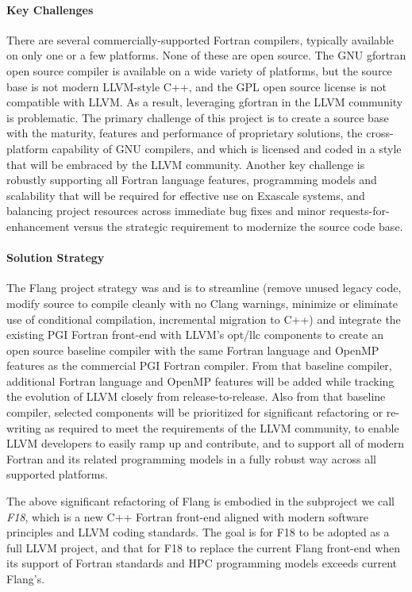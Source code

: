 \paragraph{Key Challenges}
There are several commercially-supported Fortran compilers, typically available on
only one or a few platforms.  None of these are open source.  The GNU gfortran
open source compiler is available on a wide variety of platforms, but the source
base is not modern LLVM-style C++, and the GPL open source license is not compatible
with LLVM. As a result, leveraging gfortran in the LLVM community is problematic.
The primary challenge of this project is to create a source base with the maturity,
features and performance of proprietary solutions, the cross-platform capability
of GNU compilers, and which is licensed and coded in a style that will be embraced
by the LLVM community.  Another key challenge is robustly supporting all Fortran
language features, programming models and scalability that will be required for
effective use on Exascale systems, and balancing project resources across immediate
bug fixes and minor requests-for-enhancement versus the strategic requirement to
modernize the source code base.

\paragraph{Solution Strategy}
The Flang project strategy was and is to streamline (remove unused legacy code,
modify source to compile cleanly with no Clang warnings, minimize or eliminate use
of conditional compilation, incremental migration to C++) and integrate the
existing PGI Fortran front-end with LLVM's opt/llc components to create an open
source baseline compiler with the same Fortran language and OpenMP features as
the commercial PGI Fortran compiler.  From that baseline compiler, additional
Fortran language and OpenMP features will be added while tracking the evolution
of LLVM closely from release-to-release.  Also from that baseline compiler, selected
components will be prioritized for significant refactoring or re-writing as required
to meet the requirements of the LLVM community, to enable LLVM developers to
easily ramp up and contribute, and to support all of modern Fortran and its
related programming models in a fully robust way across all supported platforms.

The above significant refactoring of Flang is embodied in the subproject we call
\emph{F18}, which is a new C++ Fortran front-end aligned with modern software
principles and LLVM coding standards. The goal is for F18 to be adopted as a
full LLVM project, and that for F18 to replace the current Flang front-end when
its support of Fortran standards and HPC programming models exceeds current Flang's.

